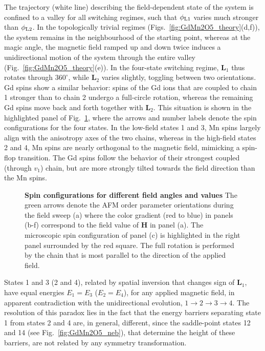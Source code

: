 The trajectory (white line) describing the field-dependent state of the system is confined to a valley for all switching regimes, such that $\phi_{\rm L1}$ varies much stronger than $\phi_{\rm L2}$.
%
In the topologically trivial regimes (Figs.~\ref{fig:GdMn2O5_theory}(d,f)), the system remains in the neighbourhood of the starting point, whereas at the magic angle, the magnetic field ramped up and down twice induces a unidirectional motion of the system through the entire valley (Fig.~\ref{fig:GdMn2O5_theory}(e)).
%
In the four-state switching regime, $\mathbf{L}_1$ thus rotates through $360^\circ$, while $\mathbf{L}_2$ varies slightly, toggling between two orientations. 
% 
Gd spins show a similar behavior: spins of the Gd ions that are coupled to chain 1 stronger than to chain 2 undergo a full-circle rotation, whereas the remaining Gd spins move back and forth together with $\mathbf{L}_2$. This situation is shown in the highlighted panel of Fig.~\ref{fig:GdMn2O5_spin_configs}, where the arrows and number labels denote the spin configurations for the four states.
%
In the low-field states 1 and 3, Mn spins largely align with the anisotropy axes of the two chains, whereas in the high-field states 2 and 4, Mn spins are nearly orthogonal to the magnetic field, mimicking a spin-flop transition.
%
The Gd spins follow the behavior of their strongest coupled (through $v_1$) chain, but are more strongly tilted towards the field direction than the Mn spins. 
%
\begin{figure}[h]
	\caption{{\bf Spin configurations for different field angles and values} The green arrows denote the AFM order parameter orientations during the field sweep (a) where the color gradient (red to blue) in panels (b-f) correspond to the field value of $\mathbf{H}$ in panel (a). The microscopic spin configuration of panel (c) is highlighted in the right panel surrounded by the red square. The full rotation is performed by the chain that is most parallel to the direction of the applied field.\label{fig:GdMn2O5_spin_configs}}  
\end{figure}

States 1 and 3 (2 and 4), related by spatial inversion that changes sign of $\mathbf{L}_1$, have equal energies $E_1 = E_3$ ($E_2 = E_4$), for any applied magnetic field, in apparent contradiction with the unidirectional evolution, $1 \rightarrow 2 \rightarrow 3 \rightarrow 4$.
%
The resolution of this paradox lies in the fact that the energy barriers separating state  1 from  states 2 and 4 are, in general, different, since the saddle-point states 12 and 14 (see Fig.~\ref{fig:GdMn2O5_neb}), that determine the height of these barriers, are not related by any symmetry transformation. 

